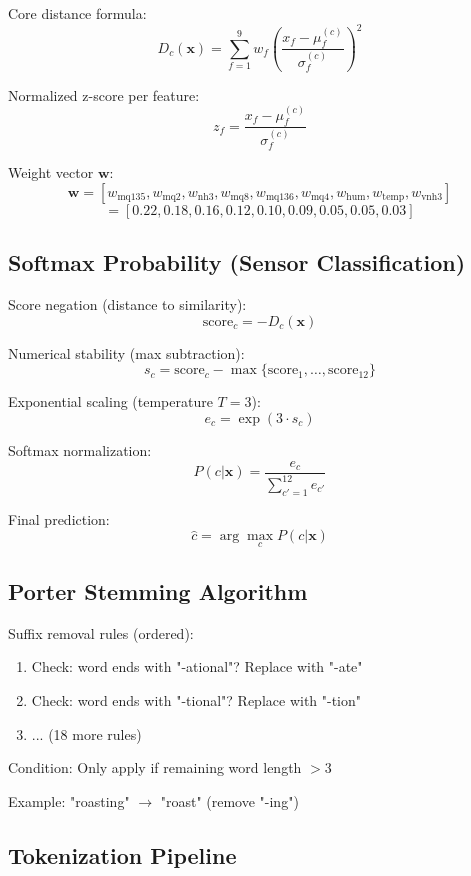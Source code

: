 \documentclass[12pt,a4paper]{article}
\begin{document}
Core distance formula:
$$D_c(\mathbf{x}) = \sum_{f=1}^{9} w_f \left(\frac{x_f - \mu_f^{(c)}}{\sigma_f^{(c)}}\right)^2$$

Normalized z-score per feature:
$$z_f = \frac{x_f - \mu_f^{(c)}}{\sigma_f^{(c)}}$$

Weight vector $\mathbf{w}$:
$$\mathbf{w} = [w_{\text{mq135}}, w_{\text{mq2}}, w_{\text{nh3}}, w_{\text{mq8}}, w_{\text{mq136}}, w_{\text{mq4}}, w_{\text{hum}}, w_{\text{temp}}, w_{\text{vnh3}}]$$
$$= [0.22, 0.18, 0.16, 0.12, 0.10, 0.09, 0.05, 0.05, 0.03]$$

\subsection{Softmax Probability (Sensor Classification)}

Score negation (distance to similarity):
$$\text{score}_c = -D_c(\mathbf{x})$$

Numerical stability (max subtraction):
$$s_c = \text{score}_c - \max\{\text{score}_1, \ldots, \text{score}_{12}\}$$

Exponential scaling (temperature $T = 3$):
$$e_c = \exp(3 \cdot s_c)$$

Softmax normalization:
$$P(c|\mathbf{x}) = \frac{e_c}{\sum_{c'=1}^{12} e_{c'}}$$

Final prediction:
$$\hat{c} = \arg\max_c P(c|\mathbf{x})$$

\subsection{Porter Stemming Algorithm}

Suffix removal rules (ordered):

\begin{enumerate}
    \item Check: word ends with "-ational"? Replace with "-ate"
    \item Check: word ends with "-tional"? Replace with "-tion"
    \item ... (18 more rules)
\end{enumerate}

Condition: Only apply if remaining word length $> 3$

Example: "roasting" $\to$ "roast" (remove "-ing")

\subsection{Tokenization Pipeline}
\end{document}
